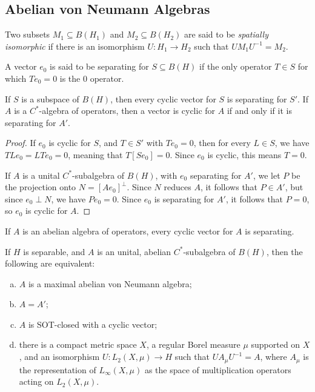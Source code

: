 \documentclass[10pt]{mypackage}
\begin{document}
\subsection{Abelian von Neumann Algebras}%
\begin{definition}
  Two subsets $M_1\subseteq B\left(H_1\right)$ and $M_2\subseteq B\left( H_2 \right)$ are said to be \textit{spatially isomorphic} if there is an isomorphism $U\colon H_1\rightarrow H_2$ such that $U M_1 U^{-1} = M_2$.
\end{definition}
\begin{definition}
  A vector $e_0$ is said to be separating for $S\subseteq B\left( H \right)$ if the only operator $T\in S$ for which $Te_0 = 0$ is the $0$ operator.
\end{definition}
\begin{proposition}
  If $S$ is a subspace of $B(H)$, then every cyclic vector for $S$ is separating for $S'$. If $A$ is a $C^{\ast}$-algebra of operators, then a vector is cyclic for $A$ if and only if it is separating for $A'$.
\end{proposition}
\begin{proof}
  If $e_0$ is cyclic for $S$, and $T\in S'$ with $Te_0 = 0$, then for every $L\in S$, we have $TLe_0 = LTe_0 = 0$, meaning that $T \left[ Se_0 \right] = 0$. Since $e_0$ is cyclic, this means $T = 0$.

  If $A$ is a unital $C^{\ast}$-subalgebra of $B(H)$, with $e_0$ separating for $A'$, we let $P$ be the projection onto $N = \left[ Ae_0 \right]^{\perp}$. Since $N$ reduces $A$, it follows that $P \in A'$, but since $e_0\perp N$, we have $Pe_0 = 0$. Since $e_0$ is separating for $A'$, it follows that $P = 0$, so $e_0$ is cyclic for $A$.
\end{proof}
\begin{corollary}
  If $A$ is an abelian algebra of operators, every cyclic vector for $A$ is separating.
\end{corollary}
\begin{theorem}
  If $H$ is separable, and $A$ is an unital, abelian $C^{\ast}$-subalgebra of $B(H)$, then the following are equivalent:
  \begin{enumerate}[(a)]
    \item $A$ is a maximal abelian von Neumann algebra;
    \item $A = A'$;
    \item $A$ is SOT-closed with a cyclic vector;
    \item there is a compact metric space $X$, a regular Borel measure $\mu$ supported on $X$, and an isomorphism $U\colon L_2\left( X,\mu \right)\rightarrow H$ such that $U A_{\mu}U^{-1} = A$, where $A_{\mu}$ is the representation of $L_{\infty}\left(X,\mu\right)$ as the space of multiplication operators acting on $L_{2}\left( X,\mu \right)$.
  \end{enumerate}
\end{theorem}
\end{document}
